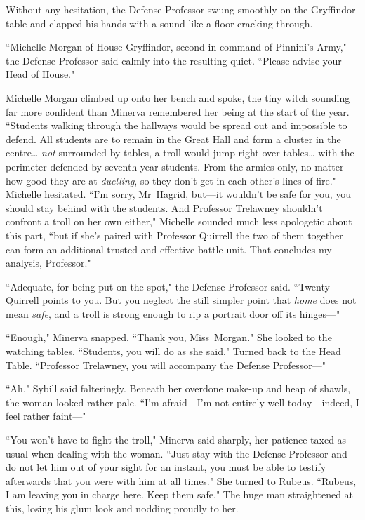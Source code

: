 Without any hesitation, the Defense Professor swung smoothly on the Gryffindor table and clapped his hands with a sound like a floor cracking through.

``Michelle Morgan of House Gryffindor, second-in-command of Pinnini's Army," the Defense Professor said calmly into the resulting quiet. ``Please advise your Head of House."

Michelle Morgan climbed up onto her bench and spoke, the tiny witch sounding far more confident than Minerva remembered her being at the start of the year. ``Students walking through the hallways would be spread out and impossible to defend. All students are to remain in the Great Hall and form a cluster in the centre{\ldots} \emph{not} surrounded by tables, a troll would jump right over tables{\ldots} with the perimeter defended by seventh-year students. From the armies only, no matter how good they are at \emph{duelling}, so they don't get in each other's lines of fire." Michelle hesitated. ``I'm sorry, Mr~Hagrid, but—it wouldn't be safe for you, you should stay behind with the students. And Professor Trelawney shouldn't confront a troll on her own either," Michelle sounded much less apologetic about this part, ``but if she's paired with Professor Quirrell the two of them together can form an additional trusted and effective battle unit. That concludes my analysis, Professor."

``Adequate, for being put on the spot," the Defense Professor said. ``Twenty Quirrell points to you. But you neglect the still simpler point that \emph{home} does not mean \emph{safe}, and a troll is strong enough to rip a portrait door off its hinges—"

``Enough," Minerva snapped. ``Thank you, Miss~Morgan." She looked to the watching tables. ``Students, you will do as she said." Turned back to the Head Table. ``Professor Trelawney, you will accompany the Defense Professor—"

``Ah," Sybill said falteringly. Beneath her overdone make-up and heap of shawls, the woman looked rather pale. ``I'm afraid—I'm not entirely well today—indeed, I feel rather faint—"

``You won't have to fight the troll," Minerva said sharply, her patience taxed as usual when dealing with the woman. ``Just stay with the Defense Professor and do not let him out of your sight for an instant, you must be able to testify afterwards that you were with him at all times." She turned to Rubeus. ``Rubeus, I am leaving you in charge here. Keep them safe." The huge man straightened at this, losing his glum look and nodding proudly to her.

